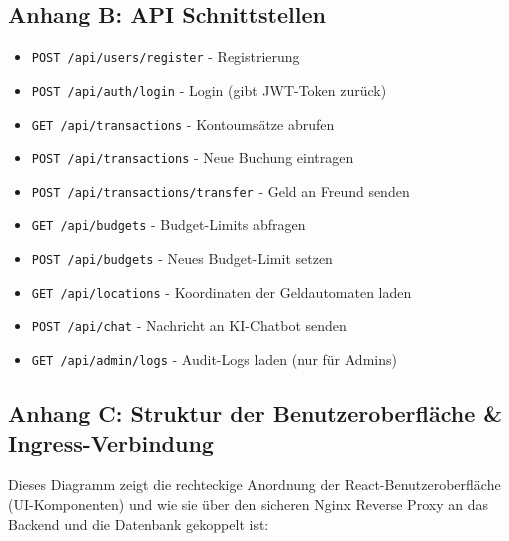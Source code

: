 \documentclass[11pt,a4paper]{article}
\begin{document}
\subsection{Anhang B: API Schnittstellen}
\begin{itemize}
    \item \texttt{POST /api/users/register} - Registrierung
    \item \texttt{POST /api/auth/login} - Login (gibt JWT-Token zurück)
    \item \texttt{GET /api/transactions} - Kontoumsätze abrufen
    \item \texttt{POST /api/transactions} - Neue Buchung eintragen
    \item \texttt{POST /api/transactions/transfer} - Geld an Freund senden
    \item \texttt{GET /api/budgets} - Budget-Limits abfragen
    \item \texttt{POST /api/budgets} - Neues Budget-Limit setzen
    \item \texttt{GET /api/locations} - Koordinaten der Geldautomaten laden
    \item \texttt{POST /api/chat} - Nachricht an KI-Chatbot senden
    \item \texttt{GET /api/admin/logs} - Audit-Logs laden (nur für Admins)
\end{itemize}

\newpage

\subsection{Anhang C: Struktur der Benutzeroberfläche \& Ingress-Verbindung}
Dieses Diagramm zeigt die rechteckige Anordnung der React-Benutzeroberfläche (UI-Komponenten) und wie sie über den sicheren Nginx Reverse Proxy an das Backend und die Datenbank gekoppelt ist:

\vspace{1cm}
\end{document}

